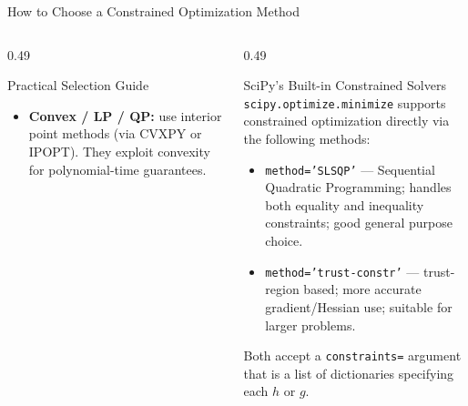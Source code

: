 \documentclass[aspectratio=169,10pt]{beamer}
\begin{document}
\begin{frame}[allowframebreaks]{How to Choose a Constrained Optimization Method}
\begin{columns}
\begin{column}{0.49\textwidth}
\begin{block}{Practical Selection Guide}
\begin{itemize}
          \item \textbf{Convex / LP / QP:} use interior point methods
                (via CVXPY or IPOPT).  They exploit convexity for
                polynomial-time guarantees.
        \end{itemize}
      \end{block}
    \end{column}
    \begin{column}{0.49\textwidth}
      \begin{exampleblock}{SciPy's Built-in Constrained Solvers}
        \texttt{scipy.optimize.minimize} supports constrained optimization
        directly via the following methods:
        \begin{itemize}
          \item \texttt{method='SLSQP'} --- Sequential Quadratic Programming;
                handles both equality and inequality constraints; good general
                purpose choice.
          \item \texttt{method='trust-constr'} --- trust-region based;
                more accurate gradient/Hessian use; suitable for larger
                problems.
        \end{itemize}
        Both accept a \texttt{constraints=} argument that is a list of
        dictionaries specifying each $h$ or $g$.
      \end{exampleblock}
    \end{column}
  \end{columns}

\end{frame}
\end{document}
